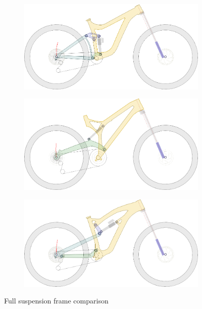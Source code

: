 		\begin{figure}[h!]
			\centering
			\begin{subfigure}[t]{0.3\textwidth}
				\centering
				\includegraphics[width=\textwidth]{../images/3_bikes/giant.png}
			\end{subfigure}
			\begin{subfigure}[t]{0.3\textwidth}
				\centering
				\includegraphics[width=\textwidth]{../images/3_bikes/empire.png}
			\end{subfigure}
			\begin{subfigure}[t]{0.3\textwidth}
				\centering
				\includegraphics[width=\textwidth]{../images/3_bikes/lapierre.png}
			\end{subfigure}
			\caption{Full suspension frame comparison}
			\label{fig:3_bike_diagrams}
		\end{figure}
